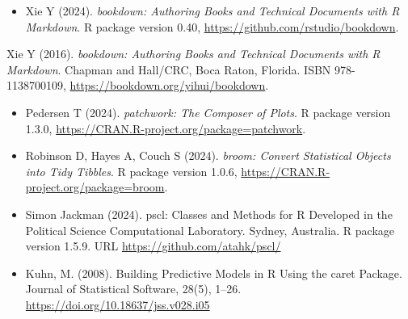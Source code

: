 \documentclass[
]{article}
\providecommand{\tightlist}{%
  \setlength{\itemsep}{0pt}\setlength{\parskip}{0pt}}
\begin{document}
\begin{itemize}
\tightlist
\item
  Xie Y (2024). \emph{bookdown: Authoring Books and Technical Documents with R Markdown}. R package version 0.40,
  \url{https://github.com/rstudio/bookdown}.
\end{itemize}

Xie Y (2016). \emph{bookdown: Authoring Books and Technical Documents with R Markdown}. Chapman and Hall/CRC, Boca Raton,
Florida. ISBN 978-1138700109, \url{https://bookdown.org/yihui/bookdown}.

\begin{itemize}
\item
  Pedersen T (2024). \emph{patchwork: The Composer of Plots}. R package version 1.3.0,
  \url{https://CRAN.R-project.org/package=patchwork}.
\item
  Robinson D, Hayes A, Couch S (2024). \emph{broom: Convert Statistical Objects into Tidy Tibbles}. R package version
  1.0.6, \url{https://CRAN.R-project.org/package=broom}.
\item
  Simon Jackman (2024). pscl: Classes and Methods for R Developed in the Political Science Computational Laboratory.
  Sydney, Australia. R package version 1.5.9. URL \url{https://github.com/atahk/pscl/}
\item
  Kuhn, M. (2008). Building Predictive Models in R Using the caret Package. Journal of Statistical Software, 28(5),
  1--26. \url{https://doi.org/10.18637/jss.v028.i05}
\end{itemize}
\end{document}
